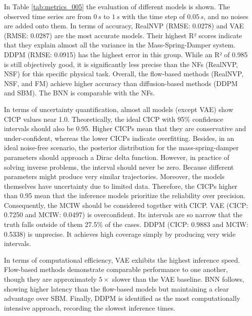 In Table \ref{tab:metrics_005} the evaluation of different models is shown. The observed time series are from $0\,s$ to $1\,s$ with the time step of $0.05\,s$, and no noises are added onto them. In terms of accuracy, \ac{RealNVP} (RMSE: 0.0278) and VAE (RMSE: 0.0287) are the most accurate models. Their highest R² scores indicate that they explain almost all the variance in the Mass-Spring-Damper system. \ac{DDPM} (RMSE: 0.0915) has the highest error in this group. While an R² of 0.985 is still objectively good, it is significantly less precise than the \acp{NF} (\ac{RealNVP}, \ac{NSF}) for this specific physical task. Overall, the flow-based methods (\ac{RealNVP}, \ac{NSF}, and \ac{FM}) achieve higher accuracy than diffusion-based methods (\ac{DDPM} and \ac{SBM}). The \ac{BNN} is comparable with the \acp{NF}.

In terms of uncertainty quantification, almost all models (except VAE) show CICP values near 1.0. Theoretically, the ideal CICP with 95\% confidence intervals should also be 0.95. Higher CICPs mean that they are conservative and under-confident, whereas the lower CICPs indicate overfitting. Besides, in an ideal noise-free scenario, the posterior distribution for the mass-spring-damper parameters should approach a Dirac delta function. However, in practice of solving inverse problems, the interval should never be zero. Because different parameters might produce very similar trajectories. Moreover, the models themselves have uncertainty due to limited data. Therefore, the CICPs higher than 0.95 mean that the inference models prioritize the reliability over precision.  Consequently, the MCIW should be considered together with CICP. \ac{VAE} (CICP: 0.7250 and MCIW: 0.0497) is overconfident. Its intervals are so narrow that the truth falls outside of them 27.5\% of the cases. \ac{DDPM} (CICP: 0.9883 and MCIW: 0.5338) is unprecise. It achieves high coverage simply by producing very wide intervals. 

In terms of computational efficiency, \ac{VAE} exhibits the highest inference speed. Flow-based methods demonstrate comparable performance to one another, though they are approximately $5\times$ slower than the \ac{VAE} baseline. \ac{BNN} follows, showing higher latency than the flow-based models but maintaining a clear advantage over \ac{SBM}. Finally, \ac{DDPM} is identified as the most computationally intensive approach, recording the slowest inference times.

